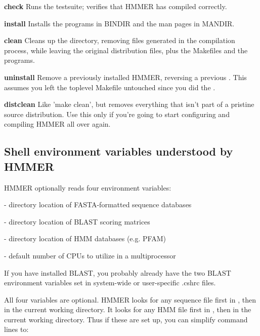 \begin{wideitem}
\item[\textbf{check}] Runs the testsuite; verifies that HMMER has
compiled correctly.

\item[\textbf{install}] Installs the programs in BINDIR and
the man pages in MANDIR.

\item[\textbf{clean}] Cleans up the directory, removing files
generated in the compilation process, while leaving the original
distribution files, plus the Makefiles and the programs.

\item[\textbf{uninstall}] Remove a previously installed HMMER,
reversing a previous . This assumes you left the
toplevel Makefile untouched since you did the .

\item[\textbf{distclean}] Like 'make clean', but removes everything
that isn't part of a pristine source distribution. Use this only if
you're going to start configuring and compiling HMMER all over again.
\end{wideitem}

\subsection{Shell environment variables understood by HMMER}

HMMER optionally reads four environment variables:

\begin{wideitem}
\item[\emprog{BLASTDB}] - directory location of FASTA-formatted sequence databases
\item[\emprog{BLASTMAT}] - directory location of BLAST scoring matrices
\item[\emprog{HMMERDB}] - directory location of HMM databases (e.g. PFAM)
\item[\emprog{HMMER\_NCPU}] - default number of CPUs to utilize in a multiprocessor
\end{wideitem}

If you have installed BLAST, you probably already have the two BLAST
environment variables set in system-wide or user-specific .cshrc
files.

All four variables are optional. HMMER looks for any sequence file
first in , then in the current working directory. It
looks for any HMM file first in , then in the current
working directory. Thus if these are set up, you can simplify command
lines to:

